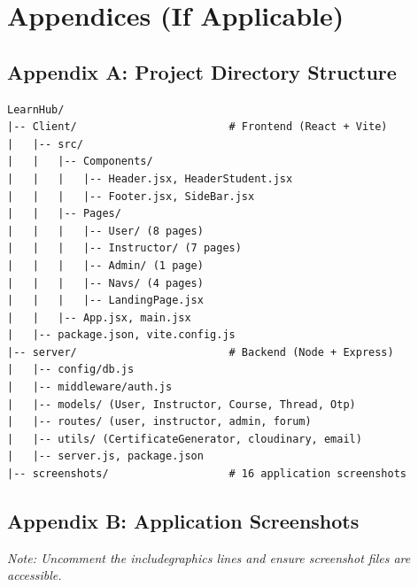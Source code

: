 \documentclass[12pt,a4paper]{report}
\begin{document}
\chapter{Appendices (If Applicable)}

\section{Appendix A: Project Directory Structure}
\begin{lstlisting}[language={}, caption={Complete Project Structure}]
LearnHub/
|-- Client/                        # Frontend (React + Vite)
|   |-- src/
|   |   |-- Components/
|   |   |   |-- Header.jsx, HeaderStudent.jsx
|   |   |   |-- Footer.jsx, SideBar.jsx
|   |   |-- Pages/
|   |   |   |-- User/ (8 pages)
|   |   |   |-- Instructor/ (7 pages)
|   |   |   |-- Admin/ (1 page)
|   |   |   |-- Navs/ (4 pages)
|   |   |   |-- LandingPage.jsx
|   |   |-- App.jsx, main.jsx
|   |-- package.json, vite.config.js
|-- server/                        # Backend (Node + Express)
|   |-- config/db.js
|   |-- middleware/auth.js
|   |-- models/ (User, Instructor, Course, Thread, Otp)
|   |-- routes/ (user, instructor, admin, forum)
|   |-- utils/ (CertificateGenerator, cloudinary, email)
|   |-- server.js, package.json
|-- screenshots/                   # 16 application screenshots
\end{lstlisting}

\section{Appendix B: Application Screenshots}
\textit{Note: Uncomment the includegraphics lines and ensure screenshot files are accessible.}
\end{document}
